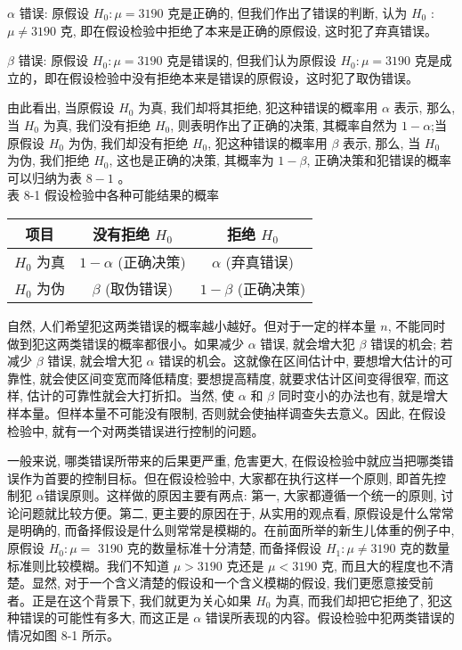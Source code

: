 \documentclass[10pt]{article}
\begin{document}
\begin{CJK*}{UTF8}{bsmi}
$\alpha$ 错误: 原假设 $H_{0}: \mu=3190$ 克是正确的, 但我们作出了错误的判断, 认为 $H_{0}$ : $\mu \neq 3190$ 克, 即在假设检验中拒绝了本来是正确的原假设, 这时犯了弃真错误。

$\beta$ 错误: 原假设 $H_{0}: \mu=3190$ 克是错误的, 但我们认为原假设 $H_{0}: \mu=3190$ 克是成立的，即在假设检验中没有拒绝本来是错误的原假设，这时犯了取伪错误。

由此看出, 当原假设 $H_{0}$ 为真, 我们却将其拒绝, 犯这种错误的概率用 $\alpha$ 表示, 那么, 当 $H_{0}$ 为真, 我们没有拒绝 $H_{0}$, 则表明作出了正确的决策, 其概率自然为 $1-\alpha$;当原假设 $H_{0}$ 为伪, 我们却没有拒绝 $H_{0}$, 犯这种错误的概率用 $\beta$ 表示, 那么, 当 $H_{0}$ 为伪, 我们拒绝 $H_{0}$, 这也是正确的决策, 其概率为 $1-\beta$, 正确决策和犯错误的概率可以归纳为表 $8-1$ 。\\
表 8-1 假设检验中各种可能结果的概率

\begin{center}
\begin{tabular}{ccc}
\hline
项目 & 没有拒绝 $H_{0}$ & 拒绝 $H_{0}$ \\
\hline
$H_{0}$ 为真 & $1-\alpha$ (正确决策) & $\alpha$ (弃真错误) \\
$H_{0}$ 为伪 & $\beta$ (取伪错误) & $1-\beta$ (正确决策) \\
\hline
\end{tabular}
\end{center}

自然, 人们希望犯这两类错误的概率越小越好。但对于一定的样本量 $n$, 不能同时做到犯这两类错误的概率都很小。如果减少 $\alpha$ 错误, 就会增大犯 $\beta$ 错误的机会; 若减少 $\beta$ 错误, 就会增大犯 $\alpha$ 错误的机会。这就像在区间估计中, 要想增大估计的可靠性, 就会使区间变宽而降低精度; 要想提高精度, 就要求估计区间变得很窄, 而这样, 估计的可靠性就会大打折扣。当然, 使 $\alpha$ 和 $\beta$ 同时变小的办法也有, 就是增大样本量。但样本量不可能没有限制, 否则就会使抽样调查失去意义。因此, 在假设检验中, 就有一个对两类错误进行控制的问题。

一般来说, 哪类错误所带来的后果更严重, 危害更大, 在假设检验中就应当把哪类错误作为首要的控制目标。但在假设检验中, 大家都在执行这样一个原则, 即首先控制犯 $\alpha$错误原则。这样做的原因主要有两点: 第一, 大家都遵循一个统一的原则, 讨论问题就比较方便。第二, 更主要的原因在于, 从实用的观点看, 原假设是什么常常是明确的, 而备择假设是什么则常常是模糊的。在前面所举的新生儿体重的例子中, 原假设 $H_{0}: \mu=$ 3190 克的数量标准十分清楚, 而备择假设 $H_{1}: \mu \neq 3190$ 克的数量标准则比较模糊。我们不知道 $\mu>3190$ 克还是 $\mu<3190$ 克, 而且大的程度也不清楚。显然, 对于一个含义清楚的假设和一个含义模糊的假设, 我们更愿意接受前者。正是在这个背景下, 我们就更为关心如果 $H_{0}$ 为真, 而我们却把它拒绝了, 犯这种错误的可能性有多大, 而这正是 $\alpha$ 错误所表现的内容。假设检验中犯两类错误的情况如图 8-1 所示。


\end{CJK*}
\end{document}
